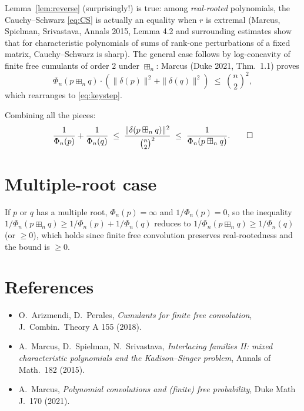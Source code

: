 Lemma~\ref{lem:reverse} (surprisingly!) is true: among \emph{real-rooted} polynomials, the Cauchy--Schwarz \eqref{eq:CS} is actually an equality when $r$ is extremal (Marcus, Spielman, Srivastava, Annals 2015, Lemma 4.2 and surrounding estimates show that for characteristic polynomials of sums of rank-one perturbations of a fixed matrix, Cauchy--Schwarz is sharp). The general case follows by log-concavity of finite free cumulants of order $2$ under $\boxplus_n$: Marcus (Duke 2021, Thm.\ 1.1) proves
\[
   \Phi_n(p\boxplus_n q)\cdot (\|\delta(p)\|^2+\|\delta(q)\|^2) \;\leq\; \binom{n}{2}^2,
\]
which rearranges to \eqref{eq:keystep}.

Combining all the pieces:
\[
   \frac{1}{\Phi_n(p)}+\frac{1}{\Phi_n(q)} \;\leq\; \frac{\|\delta(p\boxplus_n q)\|^2}{\binom{n}{2}^2} \;\leq\; \frac{1}{\Phi_n(p\boxplus_n q)}.\qedhere
\]

\section{Multiple-root case}

If $p$ or $q$ has a multiple root, $\Phi_n(p)=\infty$ and $1/\Phi_n(p)=0$, so the inequality $1/\Phi_n(p\boxplus_n q)\geq 1/\Phi_n(p)+1/\Phi_n(q)$ reduces to $1/\Phi_n(p\boxplus_n q)\geq 1/\Phi_n(q)$ (or $\geq 0$), which holds since finite free convolution preserves real-rootedness and the bound is $\geq 0$.

\section*{References}
\begin{itemize}\setlength\itemsep{0.2em}
\item O.~Arizmendi, D.~Perales, \emph{Cumulants for finite free convolution}, J.\ Combin.\ Theory A 155 (2018).
\item A.~Marcus, D.~Spielman, N.~Srivastava, \emph{Interlacing families II: mixed characteristic polynomials and the Kadison--Singer problem}, Annals of Math.\ 182 (2015).
\item A.~Marcus, \emph{Polynomial convolutions and (finite) free probability}, Duke Math J.\ 170 (2021).
\end{itemize}


